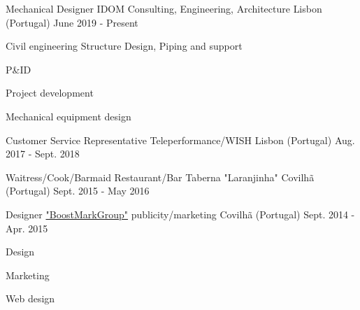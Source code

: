 


\begin{cventries}

  \cventry  
  	{Mechanical Designer} %
    {IDOM Consulting, Engineering, Architecture} %
    {Lisbon (Portugal)} %
    {June 2019 - Present} %
    {
      \begin{cvitems} %
		\item {Civil engineering Structure Design, Piping and support}
  		\item {P\&ID}
  		\item {Project development}
  		\item {Mechanical equipment design}
      \end{cvitems}
    }  
    
  \cventry    
    {Customer Service Representative} %
    {Teleperformance/WISH} %
    {Lisbon (Portugal)} %
    {Aug. 2017 - Sept. 2018} %
    {      
    }
    
  \cventry    
    {Waitress/Cook/Barmaid} %
    {Restaurant/Bar Taberna "Laranjinha"} %
    {Covilhã (Portugal)} %
    {Sept. 2015 - May 2016} %
    {
    }    
    
  \cventry    
    {Designer} %
    {\href{http://boostmarkgroup.com/}{"BoostMarkGroup"} publicity/marketing} %
    {Covilhã (Portugal)} %
    {Sept. 2014 - Apr. 2015} %
    {      
      \begin{cvitems} %
      	\item {Design}
		\item {Marketing}
		\item {Web design}
      \end{cvitems}
    }  
    

\end{cventries}
